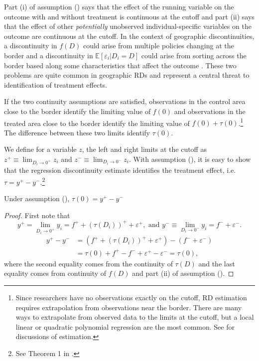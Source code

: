 \documentclass[12pt]{article}
\begin{document}
Part (i) of assumption () says that the effect of the running variable on the outcome with and without treatment is continuous at the cutoff and part (ii) says that the effect of other \emph{potentially} unobserved individual-specific variables on the outcome are continuous at the cutoff. In the context of geographic discontinuities, a discontinuity in $f(D)$ could arise from multiple policies changing at the border and a discontinuity in $\mathbb{E}\left[ \varepsilon_i \vert D_i = D \right]$ could arise from sorting across the border based along some characteristics that affect the outcome \citep{Keele_Titiunik_2015}. These two problems are quite common in geographic RDs and represent a central threat to identification of treatment effects. 

If the two continuity assumptions are satisfied, observations in the control area close to the border identify the limiting value of $f(0)$ and observations in the treated area close to the border identify the limiting value of $f(0) + \tau(0)$.\footnote{Since researchers have no observations exactly on the cutoff, RD estimation requires extrapolation from observations near the border. There are many ways to extrapolate from observed data to the limits at the cutoff, but a local linear or quadratic polynomial regression are the most common. See \citet{Cattaneo_Idrobo_Titiunik_2019} for discussions of estimation.} The difference between these two limits identify $\tau(0)$.

We define for a variable $z$, the left and right limits at the cutoff as $z^+ \equiv \lim_{D_i \to 0^+} z_i$ and $z^- \equiv \lim_{D_i \to 0^-} z_i$. With assumption (), it is easy to show that the regression discontinuity estimate identifies the treatment effect, i.e. $\tau = y^+ - y^-$.\footnote{See Theorem 1 in \citet{Hahn_Todd_Klaauw_2001}.} 

\begin{theorem}[RD Identification]
    Under assumption (), $\tau(0) = y^+ - y^-$
\end{theorem}

\begin{proof}\hspace{2.5mm}
    First note that 
    $$y^+ = \lim_{D_i \to 0^+} y_i = f^+ + \left(\tau(D_i)\right)^+ + \varepsilon^+, \text{ and } y^- \equiv \lim_{D_i \to 0^-} y_i = f^- + \varepsilon^-.$$
    \begin{align*}
        y^+ - y^- &= (f^+ + \left(\tau(D_i)\right)^+  + \varepsilon^+) - (f^- + \varepsilon^-) \\
        &= \tau(0) + f^+ - f^- + \varepsilon^+ - \varepsilon^- = \tau(0),
    \end{align*} 
    where the second equality comes from the continuity of $\tau(D)$ and the last equality comes from continuity of $f(D)$ and part (ii) of assumption ().
\end{proof}
\end{document}
